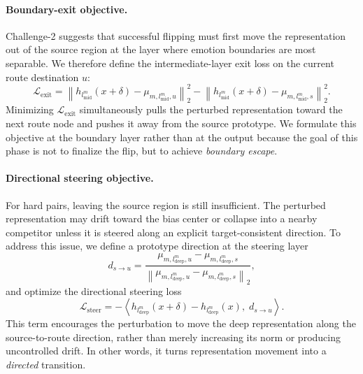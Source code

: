 \paragraph{Boundary-exit objective.}
Challenge-2 suggests that successful flipping must first move the representation out of the source region at the layer where emotion boundaries are most separable. We therefore define the intermediate-layer exit loss on the current route destination $u$:
\begin{equation}
\mathcal{L}_{\mathrm{exit}}
=
\left\|h_{l^{m}_{\mathrm{mid}}}(x+\delta)-\mu_{m,l^{m}_{\mathrm{mid}},u}\right\|_2^2
-
\left\|h_{l^{m}_{\mathrm{mid}}}(x+\delta)-\mu_{m,l^{m}_{\mathrm{mid}},s}\right\|_2^2.
\label{eq:tempo-exit}
\end{equation}
Minimizing $\mathcal{L}_{\mathrm{exit}}$ simultaneously pulls the perturbed representation toward the next route node and pushes it away from the source prototype. We formulate this objective at the boundary layer rather than at the output because the goal of this phase is not to finalize the flip, but to achieve \emph{boundary escape}.

\paragraph{Directional steering objective.}
For hard pairs, leaving the source region is still insufficient. The perturbed representation may drift toward the bias center or collapse into a nearby competitor unless it is steered along an explicit target-consistent direction. To address this issue, we define a prototype direction at the steering layer
\begin{equation}
d_{s\rightarrow u}
=
\frac{\mu_{m,l^{m}_{\mathrm{deep}},u}-\mu_{m,l^{m}_{\mathrm{deep}},s}}
{\left\|\mu_{m,l^{m}_{\mathrm{deep}},u}-\mu_{m,l^{m}_{\mathrm{deep}},s}\right\|_2},
\label{eq:tempo-direction}
\end{equation}
and optimize the directional steering loss
\begin{equation}
\mathcal{L}_{\mathrm{steer}}
=
-\left\langle
h_{l^{m}_{\mathrm{deep}}}(x+\delta)-h_{l^{m}_{\mathrm{deep}}}(x),\;
d_{s\rightarrow u}
\right\rangle.
\label{eq:tempo-steer}
\end{equation}
This term encourages the perturbation to move the deep representation along the source-to-route direction, rather than merely increasing its norm or producing uncontrolled drift. In other words, it turns representation movement into a \emph{directed} transition.

